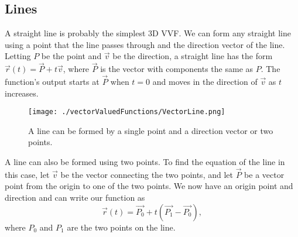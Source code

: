 \subsection{Lines}
\noindent
A straight line is probably the simplest 3D VVF. We can form any straight line using a point that the line passes through and the direction vector of the line.
Letting $P$ be the point and $\vec{v}$ be the direction, a straight line has the form $\vec{r}(t) = \vec{P}+t\vec{v}$, where $\vec{P}$ is the vector with components the same as $P$.
The function's output starts at $\vec{P}$ when $t=0$ and moves in the direction of $\vec{v}$ as $t$ increases.

\begin{figure}[H]
	\centering
	\texttt{[image: ./vectorValuedFunctions/VectorLine.png]}
	\caption{A line can be formed by a single point and a direction vector or two points.}
\end{figure}

\noindent
A line can also be formed using two points.
To find the equation of the line in this case, let $\vec{v}$ be the vector connecting the two points, and let $\vec{P}$ be a vector point from the origin to one of the two points.
We now have an origin point and direction and can write our function as
\begin{equation*}
	\vec{r}(t) = \vec{P_0} + t\left(\vec{P_1} - \vec{P_0}\right),
\end{equation*}
where $P_0$ and $P_1$ are the two points on the line.